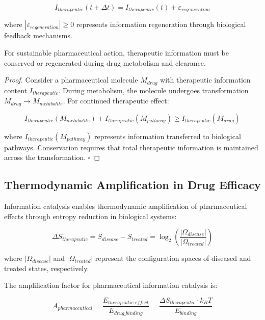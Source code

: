\begin{equation}
I_{therapeutic}(t + \Delta t) = I_{therapeutic}(t) + \varepsilon_{regeneration}
\end{equation}

where $|\varepsilon_{regeneration}| \geq 0$ represents information regeneration through biological feedback mechanisms.

\begin{theorem}
For sustainable pharmaceutical action, therapeutic information must be conserved or regenerated during drug metabolism and clearance.
\end{theorem}

\begin{proof}
Consider a pharmaceutical molecule $M_{drug}$ with therapeutic information content $I_{therapeutic}$. During metabolism, the molecule undergoes transformation $M_{drug} \rightarrow M_{metabolite}$. For continued therapeutic effect:

$$I_{therapeutic}(M_{metabolite}) + I_{therapeutic}(M_{pathway}) \geq I_{therapeutic}(M_{drug})$$

where $I_{therapeutic}(M_{pathway})$ represents information transferred to biological pathways. Conservation requires that total therapeutic information is maintained across the transformation. $\square$
\end{proof}

\subsection{Thermodynamic Amplification in Drug Efficacy}

Information catalysis enables thermodynamic amplification of pharmaceutical effects through entropy reduction in biological systems:

\begin{equation}
\Delta S_{therapeutic} = S_{disease} - S_{treated} = \log_2\left(\frac{|\Omega_{disease}|}{|\Omega_{treated}|}\right)
\end{equation}

where $|\Omega_{disease}|$ and $|\Omega_{treated}|$ represent the configuration spaces of diseased and treated states, respectively.

The amplification factor for pharmaceutical information catalysis is:

\begin{equation}
A_{pharmaceutical} = \frac{E_{therapeutic\_effect}}{E_{drug\_binding}} = \frac{\Delta S_{therapeutic} \cdot k_B T}{E_{binding}}
\end{equation}

